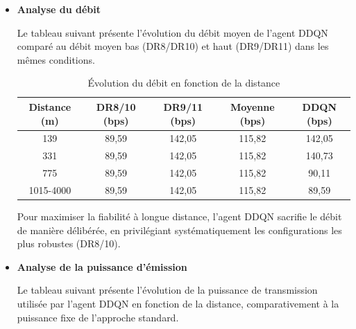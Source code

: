 \begin{itemize}
	L'agent DDQN améliore le PDR dans 11 cas sur 13 (85\% des distances), avec une amélioration moyenne de 2,3 points. Les gains les plus significatifs sont observés aux longues distances : +11,3 points à 4000 m, +5,8 points à 2816 m et +5,5 points à 3000 m.
	
	\item \textbf{Analyse du débit}
	
	Le tableau suivant présente l'évolution du débit moyen de l'agent DDQN comparé au débit moyen bas (DR8/DR10) et haut (DR9/DR11) dans les mêmes conditions.
	
	\begin{table}[H]
		\centering
		\caption{Évolution du débit en fonction de la distance}
		\label{tab:debit_distance}
		\begin{tabular}{|c|c|c|c|c|}
			\hline
			\textbf{Distance (m)} &  \textbf{DR8/10 (bps)} & \textbf{DR9/11 (bps)} &   \textbf{Moyenne (bps)} & \textbf{DDQN (bps)} \\
			\hline
			139    & 89,59  & 142,05 & 115,82 & 142,05 \\
			\hline
			331    & 89,59  & 142,05 & 115,82 & 140,73 \\
			\hline
			775    & 89,59  & 142,05 & 115,82 & 90,11 \\
			\hline
			1015-4000 & 89,59  & 142,05 & 115,82  & 89,59 \\
			\hline
		\end{tabular}
	\end{table}
	Pour maximiser la fiabilité à longue distance, l'agent DDQN sacrifie le débit de manière délibérée, en privilégiant systématiquement les configurations les plus robustes (DR8/10).
		
	\item \textbf{Analyse de la puissance d'émission}
	
	Le tableau suivant présente l'évolution de la puissance de transmission utilisée par l'agent DDQN en fonction de la distance, comparativement à la puissance fixe de l'approche standard.
	

\end{itemize}
